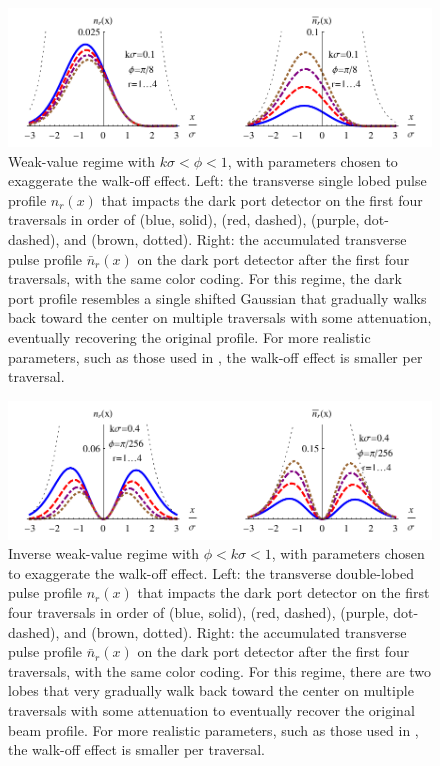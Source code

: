 \begin{figure}[th]
  \begin{center}
    \includegraphics[width=6in]{PulsedRecycling/Figures/beam2a.pdf}
  \end{center}
  \caption{Weak-value regime with $k\sigma < \phi < 1$, with parameters chosen to exaggerate the walk-off effect.  Left: the transverse single lobed pulse profile $n_r(x)$ that impacts the dark port detector on the first four traversals in order of (blue, solid), (red, dashed), (purple, dot-dashed), and (brown, dotted).  Right: the accumulated transverse pulse profile $\bar{n}_r(x)$ on the dark port detector after the first four traversals, with the same color coding.  For this regime, the dark port profile resembles a single shifted Gaussian that gradually walks back toward the center on multiple traversals with some attenuation, eventually recovering the original profile.  For more realistic parameters, such as those used in \cite{Dixon2009}, the walk-off effect is smaller per traversal. }
  \label{fig:beam2a}
\end{figure}

\begin{figure}[th]
  \begin{center}
    \includegraphics[width=6in]{PulsedRecycling/Figures/beam3a.pdf}
  \end{center}
  \caption{Inverse weak-value regime with $\phi < k\sigma < 1$, with parameters chosen to exaggerate the walk-off effect.  Left: the transverse double-lobed pulse profile $n_r(x)$ that impacts the dark port detector on the first four traversals in order of (blue, solid), (red, dashed), (purple, dot-dashed), and (brown, dotted).  Right: the accumulated transverse pulse profile $\bar{n}_r(x)$ on the dark port detector after the first four traversals, with the same color coding.  For this regime, there are two lobes that very gradually walk back toward the center on multiple traversals with some attenuation to eventually recover the original beam profile.  For more realistic parameters, such as those used in \cite{Starling2010a,Starling2010b}, the walk-off effect is smaller per traversal. }
  \label{fig:beam3a}
\end{figure}

